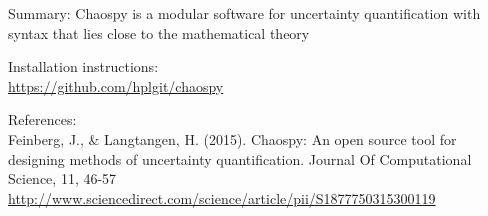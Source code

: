 \documentclass[handout]{beamer}
\begin{document}
\begin{frame}{Summary: Chaospy is a modular software for uncertainty quantification with syntax that lies close to the mathematical theory}

  \begin{alert}{Installation instructions:}\\
  \scriptsize
      \href{https://github.com/hplgit/chaospy}{https://github.com/hplgit/chaospy}\\
  \end{alert}


\vspace{7mm}

  \begin{alert}{References:}\\
  \scriptsize
      Feinberg, J., \& Langtangen, H. (2015). Chaospy: An open source tool for designing methods of uncertainty quantification. Journal Of Computational Science, 11, 46-57\\
      \href{http://www.sciencedirect.com/science/article/pii/S1877750315300119}{http://www.sciencedirect.com/science/article/pii/S1877750315300119}
  \end{alert}







\end{frame}
\end{document}
